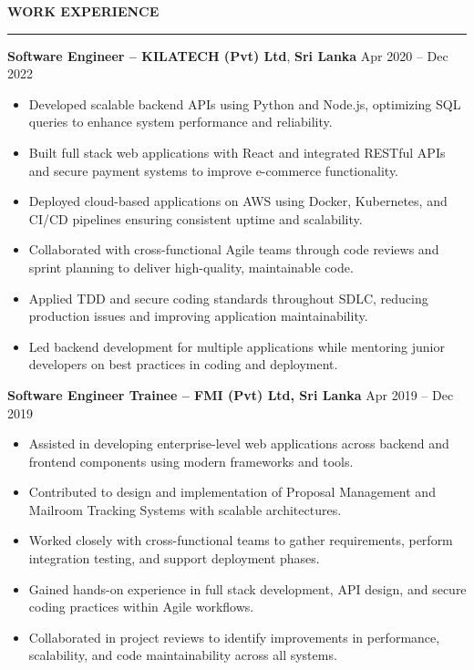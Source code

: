 \documentclass[10pt,letterpaper]{article}
\begin{document}
\vspace{8pt}

\textbf{WORK EXPERIENCE}\\[-8pt]
\noindent\rule{\textwidth}{1pt}

\vspace{-2pt}

\textbf{Software Engineer -- KILATECH (Pvt) Ltd}, \textbf{Sri Lanka} \hfill Apr 2020 -- Dec 2022

\vspace{-1pt}

\begin{itemize}
\item Developed scalable backend APIs using Python and Node.js, optimizing SQL queries to enhance system performance and reliability.
\item Built full stack web applications with React and integrated RESTful APIs and secure payment systems to improve e-commerce functionality.
\item Deployed cloud-based applications on AWS using Docker, Kubernetes, and CI/CD pipelines ensuring consistent uptime and scalability.
\item Collaborated with cross-functional Agile teams through code reviews and sprint planning to deliver high-quality, maintainable code.
\item Applied TDD and secure coding standards throughout SDLC, reducing production issues and improving application maintainability.
\item Led backend development for multiple applications while mentoring junior developers on best practices in coding and deployment.
\end{itemize}

\textbf{Software Engineer Trainee -- FMI (Pvt) Ltd, Sri Lanka} \hfill Apr 2019 -- Dec 2019

\vspace{-1pt}

\begin{itemize}
\item Assisted in developing enterprise-level web applications across backend and frontend components using modern frameworks and tools.
\item Contributed to design and implementation of Proposal Management and Mailroom Tracking Systems with scalable architectures.
\item Worked closely with cross-functional teams to gather requirements, perform integration testing, and support deployment phases.
\item Gained hands-on experience in full stack development, API design, and secure coding practices within Agile workflows.
\item Collaborated in project reviews to identify improvements in performance, scalability, and code maintainability across all systems.
\end{itemize}
\end{document}
